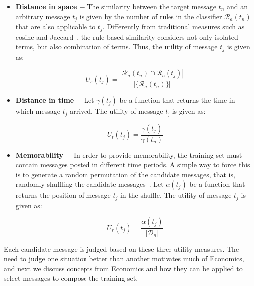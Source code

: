 \begin{itemize}
\item{\bf{Distance in space} $-$}
The similarity between the target message $t_n$ and an arbitrary message $t_j$ is given by the number of rules in the classifier $\mathcal{R}_a(t_n)$ that are also applicable to $t_j$.
Differently from traditional measures such as cosine and Jaccard~\cite{baeza99modern}, the rule-based similarity considers not only isolated terms, but also combination of terms.
Thus, the utility of message $t_j$ is given as:

\begin{equation}
U_s(t_j)=\displaystyle\frac{|\mathcal{R}_a(t_n)\cap\mathcal{R}_a(t_j)|}{|\{\mathcal{R}_a(t_n)\}|}
\end{equation}

\item{\bf{Distance in time} $-$}
Let $\gamma(t_j)$ be a function that returns the time in which message $t_j$ arrived. The utility of message $t_j$ is given as: 

\begin{equation}
U_t(t_j)=\displaystyle\frac{\gamma(t_j)}{\gamma(t_n)}
\end{equation}

\item{\bf{Memorability} $-$}
In order to provide memorability, the training set must contain messages posted in different time periods. A simple way to force this is to generate a random permutation of the candidate messages, that is, randomly shuffling the candidate messages~\cite{permutation}.
Let $\alpha(t_j)$ be a function that returns the position of message $t_j$ in the shuffle.
The utility of message $t_j$ is given as:

\begin{equation}
U_r(t_j)=\frac{\alpha(t_j)}{|\mathcal{D}_n|}
\end{equation}



\end{itemize}

Each candidate message is judged based on these three utility measures. The need to judge one situation better than another motivates much of Economics, and next we discuss concepts from Economics and how they can be applied to select messages to compose the training set.




